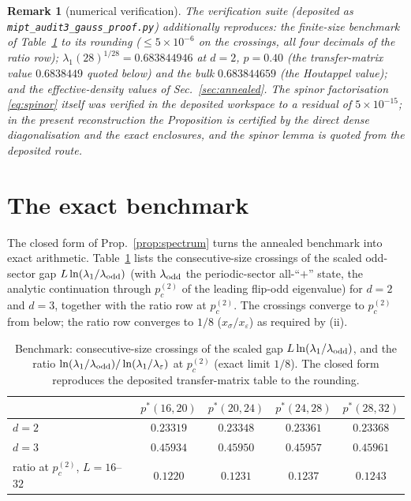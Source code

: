 \documentclass[11pt]{article}
\newtheorem{remark}{Remark}
\newcommand{\pctwo}{p_c^{(2)}}
\begin{document}
\begin{remark}[numerical verification]\label{rem:verification}
The verification suite (deposited as \texttt{mipt\_audit3\_gauss\_proof.py})
additionally reproduces: the finite-size benchmark of
Table~\ref{tab:benchmark} to its rounding ($\le5\times10^{-6}$ on the
crossings, all four decimals of the ratio row);
$\lambda_1(28)^{1/28}=0.683844946$ at $d=2$, $p=0.40$ (the transfer-matrix
value $0.6838449$ quoted below) and the bulk $0.683844659$ (the Houtappel
value); and the effective-density values of Sec.~\ref{sec:annealed}.  The
spinor factorisation \eqref{eq:spinor} itself was verified in the deposited
workspace to a residual of $5\times10^{-15}$; in the present reconstruction
the Proposition is certified by the direct dense diagonalisation and the
exact enclosures, and the spinor lemma is quoted from the deposited route.
\end{remark}

\section{The exact benchmark}\label{sec:benchmark}

The closed form of Prop.~\ref{prop:spectrum} turns the annealed benchmark
into exact arithmetic.  Table~\ref{tab:benchmark} lists the consecutive-size
crossings of the scaled odd-sector gap $L\ln(\lambda_1/\lambda_{\rm odd})$
(with $\lambda_{\rm odd}$ the periodic-sector all-``$+$'' state, the analytic
continuation through $\pctwo$ of the leading flip-odd eigenvalue) for
$d=2$ and $d=3$, together with the ratio row at $\pctwo$.  The crossings
converge to $\pctwo$ from below; the ratio row converges to $1/8$
($x_\sigma/x_\varepsilon$) as required by (ii).

\begin{table}[t]
\centering
\begin{tabular}{lcccc}
\toprule
 & $p^*(16,20)$ & $p^*(20,24)$ & $p^*(24,28)$ & $p^*(28,32)$\\
\midrule
$d=2$ & $0.23319$ & $0.23348$ & $0.23361$ & $0.23368$\\
$d=3$ & $0.45934$ & $0.45950$ & $0.45957$ & $0.45961$\\
\midrule
ratio at $\pctwo$, $L=16$--$32$ & $0.1220$ & $0.1231$ & $0.1237$ & $0.1243$\\
\bottomrule
\end{tabular}
\caption{Benchmark: consecutive-size crossings of the scaled gap
$L\ln(\lambda_1/\lambda_{\rm odd})$, and the ratio
$\ln(\lambda_1/\lambda_{\rm odd})/\ln(\lambda_1/\lambda_\varepsilon)$ at
$\pctwo$ (exact limit $1/8$).  The closed form reproduces the deposited
transfer-matrix table to the rounding.}
\label{tab:benchmark}
\end{table}
\end{document}
